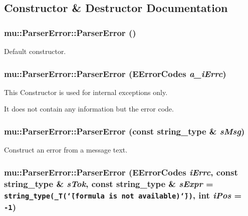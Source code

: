 \subsection{Constructor \& Destructor Documentation}
\subsubsection[ParserError]{\setlength{\rightskip}{0pt plus 5cm}mu::ParserError::ParserError ()}\label{classmu_1_1ParserError_d7f1fb7501d606308cf41c3eeab49348}


Default constructor. 

\subsubsection[ParserError]{\setlength{\rightskip}{0pt plus 5cm}mu::ParserError::ParserError ({\bf EErrorCodes} {\em a\_\-iErrc})\hspace{0.3cm}{\tt  [explicit]}}\label{classmu_1_1ParserError_3f37c865f1c609337114f19525f4e625}


This Constructor is used for internal exceptions only. 

It does not contain any information but the error code. 
\subsubsection[ParserError]{\setlength{\rightskip}{0pt plus 5cm}mu::ParserError::ParserError (const {\bf string\_\-type} \& {\em sMsg})\hspace{0.3cm}{\tt  [explicit]}}\label{classmu_1_1ParserError_67297c47b34173e5a331b3ff964d1bfc}


Construct an error from a message text. 

\subsubsection[ParserError]{\setlength{\rightskip}{0pt plus 5cm}mu::ParserError::ParserError ({\bf EErrorCodes} {\em iErrc}, \/  const {\bf string\_\-type} \& {\em sTok}, \/  const {\bf string\_\-type} \& {\em sExpr} = {\tt {\bf string\_\-type}(\_\-T(\char`\"{}(formula~is~not~available)\char`\"{}))}, \/  int {\em iPos} = {\tt -1})}\label{classmu_1_1ParserError_c727d75f4c4f4f4269f0075c47288fe1}


